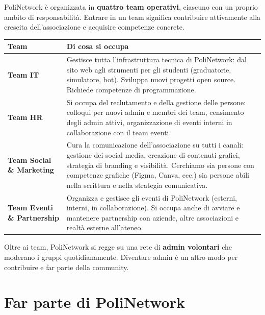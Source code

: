 \documentclass[report]{polinetwork}
\begin{document}
PoliNetwork è organizzata in \textbf{quattro team operativi},
ciascuno con un proprio ambito di responsabilità. Entrare in un
team significa contribuire attivamente alla crescita
dell'associazione e acquisire competenze concrete.

\vspace{8pt}

\begin{center}
\renewcommand{\arraystretch}{1.6}
\begin{tabularx}{\textwidth}{>{\bfseries\color{pn-primary}}l X}
\toprule
\textbf{Team} & \textbf{Di cosa si occupa} \\
\midrule
Team IT &
Gestisce tutta l'infrastruttura tecnica di PoliNetwork: dal
sito web agli strumenti per gli studenti (graduatorie, simulatore,
bot). Sviluppa nuovi progetti open source. Richiede competenze
di programmazione. \\
\addlinespace
Team HR &
Si occupa del reclutamento e della gestione delle persone:
colloqui per nuovi admin e membri dei team, censimento degli
admin attivi, organizzazione di eventi interni in collaborazione
con il team eventi. \\
\addlinespace
Team Social \& Marketing &
Cura la comunicazione dell'associazione su tutti i canali: gestione
dei social media, creazione di contenuti grafici, strategia di
branding e visibilità. Cerchiamo sia persone con competenze
grafiche (Figma, Canva, ecc.) sia persone abili nella scrittura
e nella strategia comunicativa. \\
\addlinespace
Team Eventi \& Partnership &
Organizza e gestisce gli eventi di PoliNetwork (esterni, interni,
in collaborazione). Si occupa anche di avviare e mantenere
partnership con aziende, altre associazioni e realtà esterne
all'ateneo. \\
\bottomrule
\end{tabularx}
\end{center}

\vspace{6pt}

Oltre ai team, PoliNetwork si regge su una rete di
\textbf{admin volontari} che moderano i gruppi quotidianamente.
Diventare admin è un altro modo per contribuire e far parte della
community.

\section{Far parte di PoliNetwork}
\end{document}
